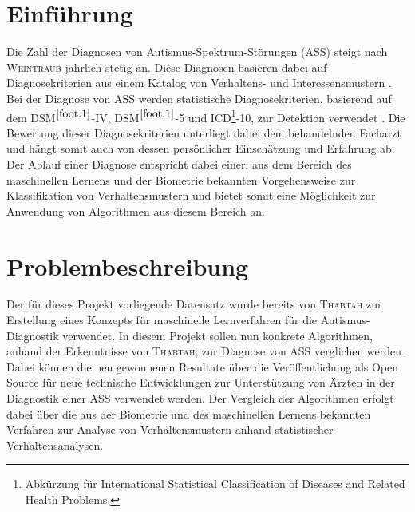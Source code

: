 \section{Einführung}
Die Zahl der Diagnosen von Autismus-Spektrum-Störungen (ASS) steigt nach \textsc{Weintraub} \cite{Weintraub2011} jährlich stetig an. Diese Diagnosen basieren dabei auf Diagnosekriterien aus einem Katalog von Verhaltens- und Interessensmustern \cite{Weintraub2011, Thabtah2017, Thabtah2018, VanElst2014}. Bei der Diagnose von ASS werden statistische Diagnosekriterien, basierend auf dem DSM$^{\ref{foot:1}}$-IV, DSM$^{\ref{foot:1}}$-5 und ICD\footnote{\label{foot:2}Abkürzung für \glqq International Statistical Classification of Diseases and Related Health Problems\grqq{}.}-10, zur Detektion verwendet \cite{Thabtah2017, VanElst2014}. Die Bewertung dieser Diagnosekriterien unterliegt dabei dem behandelnden Facharzt und hängt somit auch von dessen persönlicher Einschätzung und Erfahrung ab. Der Ablauf einer Diagnose entspricht dabei einer, aus dem Bereich des maschinellen Lernens und der Biometrie bekannten Vorgehensweise zur Klassifikation von Verhaltensmustern und bietet somit eine Möglichkeit zur Anwendung von Algorithmen aus diesem Bereich an.

\section{Problembeschreibung}
Der für dieses Projekt vorliegende Datensatz wurde bereits von \textsc{Thabtah} \cite{Thabtah2017, Thabtah2018} zur Erstellung eines Konzepts für maschinelle Lernverfahren für die Autismus-Diagnostik verwendet.
In diesem Projekt sollen nun konkrete Algorithmen, anhand der Erkenntnisse von \textsc{Thabtah}, zur Diagnose von ASS verglichen werden. Dabei können die neu gewonnenen Resultate über die Veröffentlichung als Open Source für neue technische Entwicklungen zur Unterstützung von Ärzten in der Diagnostik einer ASS verwendet werden. Der Vergleich der Algorithmen erfolgt dabei über die aus der Biometrie und des maschinellen Lernens bekannten Verfahren zur Analyse von Verhaltensmustern anhand statistischer Verhaltensanalysen.